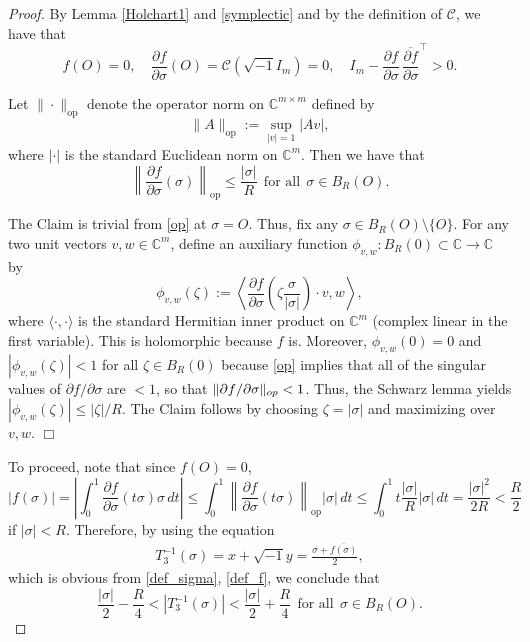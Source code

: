\documentclass[10pt,a4paper]{amsart}
\newcommand{\C}{\mathbb{C}}
\renewcommand{\leq}{\leqslant}
\begin{document}
\begin{proof}
By Lemma \ref{Holchart1} and \eqref{symplectic} and by the definition of $\mathscr{C}$, we have that 
\begin{equation}\label{op}
    f(O) = 0, \quad \frac{\partial f}{\partial \sigma}(O) = \mathscr{C}(\sqrt{-1}I_m) = 0, \quad I_{m}-\frac{\partial f}{\partial \sigma}\,\overline{\frac{\partial f}{\partial \sigma}}^{\top}>0.
\end{equation}

 Let $\|\cdot\|_{\operatorname{op}}$ denote the operator norm on $\C^{m\times m}$ defined by 
$$\|A\|_{\operatorname{op}}:=\sup_{|v|=1} |Av|,$$ 
where $|\cdot|$ is the standard Euclidean norm on $\C^{m}$. Then we have that 
$$\left\| \frac{\partial f}{\partial \sigma}(\sigma)\right\|_{\operatorname{op}}\leq \frac{|\sigma|}{R}\;\,\text{for all}\;\,\sigma \in B_R(O).$$

The Claim is trivial from \eqref{op} at $\sigma = O$. Thus, fix any $\sigma\in B_{R}(O)\setminus\{O\} $. For any two unit vectors $v,w\in \C^{m}$, define an auxiliary function $\phi_{v,w}:B_{R}(0)\subset\C\to \C$ by
$$\phi_{v,w}(\zeta):= \left\langle \frac{\partial f}{\partial \sigma}\left(\zeta \frac{\sigma}{|\sigma|}\right) \cdot v,w \right\rangle,$$
where $\langle \cdot, \cdot \rangle$ is the standard Hermitian inner product on $\mathbb{C}^m$ (complex linear in the first variable).
This is holomorphic because $f$ is. Moreover, $\phi_{v,w}(0) = 0$ and $|\phi_{v,w}(\zeta)| < 1$ for all $\zeta \in B_R(0)$ because \eqref{op} implies that all of the singular values of $\partial f/\partial \sigma$ are $< 1$, so that $\|\partial f/\partial \sigma\|_{\rm op} < 1$. Thus, the Schwarz lemma yields $|\phi_{v,w}(\zeta)| \leq |\zeta|/R$. The Claim follows by choosing $\zeta = |\sigma|$ and maximizing over $v,w$. \hfill $\Box$\medskip

\noindent To proceed, note that since $f(O)=0$,
$$
  |f(\sigma)| = \displaystyle \left|\int_{0}^{1} \frac{\partial f}{\partial \sigma}(t\sigma)\sigma \, dt\right|  
           \leq  \displaystyle \int_{0}^{1} \left\|\frac{\partial f}{\partial \sigma}(t\sigma)\right\|_{\operatorname{op}}|\sigma| \, dt 
           \leq  \displaystyle  \int_{0}^{1} t\frac{|\sigma|}{R}|\sigma| \, dt 
           =  \displaystyle  \frac{|\sigma|^2}{2R} 
           <   \displaystyle \frac{R}{2}
$$
if $|\sigma|<R$. Therefore, by using the equation
\begin{align*}
    T_3^{-1}(\sigma) = x+\sqrt{-1}y=\frac{\sigma+\overline{f(\sigma)}}{2},
\end{align*}
which is obvious from \eqref{def_sigma}, \eqref{def_f}, we conclude that
\begin{equation}\label{xy-sigma}
\frac{|\sigma|}{2}-\frac{R}{4} < |T_3^{-1}(\sigma)| < \frac{|\sigma|}{2}+\frac{R}{4} \;\,\text{for all}\;\,\sigma \in B_R(O).
\end{equation}


\end{proof}
\end{document}
